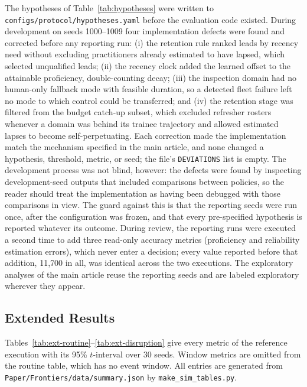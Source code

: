 \documentclass[utf8]{frontiers_suppmat}
\begin{document}
The hypotheses of Table~\ref{tab:hypotheses} were written to \texttt{configs/protocol/hypotheses.yaml} before the evaluation code existed. During development on seeds 1000--1009 four implementation defects were found and corrected before any reporting run: (i) the retention rule ranked leads by recency need without excluding practitioners already estimated to have lapsed, which selected unqualified leads; (ii) the recency clock added the learned offset to the attainable proficiency, double-counting decay; (iii) the inspection domain had no human-only fallback mode with feasible duration, so a detected fleet failure left no mode to which control could be transferred; and (iv) the retention stage was filtered from the budget catch-up subset, which excluded refresher rosters whenever a domain was behind its trainee trajectory and allowed estimated lapses to become self-perpetuating. Each correction made the implementation match the mechanism specified in the main article, and none changed a hypothesis, threshold, metric, or seed; the file's \texttt{DEVIATIONS} list is empty. The development process was not blind, however: the defects were found by inspecting development-seed outputs that included comparisons between policies, so the reader should treat the implementation as having been debugged with those comparisons in view. The guard against this is that the reporting seeds were run once, after the configuration was frozen, and that every pre-specified hypothesis is reported whatever its outcome. During review, the reporting runs were executed a second time to add three read-only accuracy metrics (proficiency and reliability estimation errors), which never enter a decision; every value reported before that addition, 11,700 in all, was identical across the two executions. The exploratory analyses of the main article reuse the reporting seeds and are labeled exploratory wherever they appear.

\subsection{Extended Results}
\label{app:extended}

Tables~\ref{tab:ext-routine}--\ref{tab:ext-disruption} give every metric of the reference execution with its 95\% $t$-interval over 30 seeds. Window metrics are omitted from the routine table, which has no event window. All entries are generated from \texttt{Paper/Frontiers/data/summary.json} by \texttt{make\_sim\_tables.py}.
\end{document}
